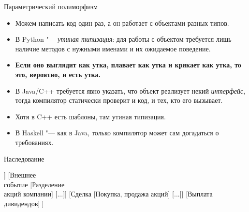 \begin{frame}[t]{Параметрический полиморфизм}
\begin{itemize}
\item
	Можем написать код один раз, а он работает с объектами разных типов.
\item
	В Python "--- \textit{утиная типизация}: для работы с объектом требуется
	лишь наличие методов с нужными именами и их ожидаемое поведение.
\item
    \textbf{Если оно выглядит как утка, плавает как утка и крякает как утка, то это, вероятно, и есть утка.}
\item
	В Java/C++ требуется явно указать, что объект реализует некий \textit{интерфейс},
	тогда компилятор статически проверит и код, и тех, кто его вызывает.
\item
	Хотя в C++ есть шаблоны, там утиная типизация.
\item
	В Haskell "--- как в Java, только компилятор может сам догадаться о требованиях.
\end{itemize}
\end{frame}

\begin{frame}[t]{Наследование}
\begin{forest}
[{Событие у\\биржевой компании},for tree={align=center,draw,fit=tight,grow'=east}
	[{Внутренний\\перевод}
    	[...]]
  	[{Внешнее\\событие}
    	[{Разделение\\акций компании}]
    	[...]]
	[{Сделка}
    	[{Покупка, продажа акций}]
    	[...]]
  	[{Выплата\\дивидендов}]
	]
\end{forest}
\end{frame}
